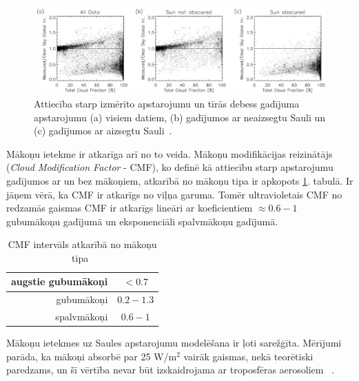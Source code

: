 \begin{figure}[h]
	\centering
	\includegraphics[width=\linewidth]{figures/misc/makoni_ietekme.jpg}
	\caption{Attiecība starp izmērīto apstarojumu un tīrās debess gadījuma apstarojumu (a) visiem datiem, (b) gadījumos ar neaizsegtu Sauli un (c) gadījumos ar aizsegtu Sauli~\cite{CloudCoverageImpactOnIrradiance}.}
	\label{fig:makoni_ietekme}
\end{figure}

Mākoņu ietekme ir atkarīga arī no to veida. Mākoņu modifikācijas reizinātājs (\textit{Cloud Modification Factor} - CMF), ko definē kā attiecību starp apstarojumu gadījumos ar un bez mākoņiem, atkarībā no mākoņu tipa ir apkopots \ref{tab:CMF}. tabulā. Ir jāņem vērā, ka CMF ir atkarīgs no viļņa garuma. Tomēr ultravioletais CMF no redzamās gaismas CMF ir atkarīgs lineāri ar koeficientiem $\approx0.6-1$ gubumākoņu gadījumā un eksponenciāli spalvmākoņu gadījumā.
\begin{table}[h]
	\caption{CMF intervāls atkarībā no mākoņu tipa~\cite{effectCloudsOnSurface}}
	\begin{center}
		\begin{tabular}{| r | c |}
			\hline
			augstie gubumākoņi & $<0.7$     \\ \hline
			gubumākoņi         & $0.2-1.3$ \\ \hline
			spalvmākoņi        & $0.6-1$    \\ \hline
		\end{tabular}
	\end{center}
	\label{tab:CMF}
\end{table}

Mākoņu ietekmes uz Saules apstarojumu modelēšana ir ļoti sarežģīta. Mērījumi parāda, ka mākoņi absorbē par 25 W/m$^2$ vairāk gaismas, nekā teorētiski paredzams, un šī vērtība nevar būt izskaidrojama ar troposfēras aerosoliem ~\cite{observVSModel}.
